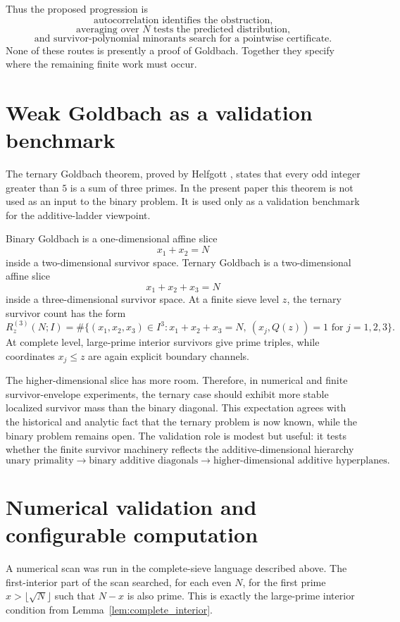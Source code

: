 \documentclass[11pt]{article}
\theoremstyle{plain}
\theoremstyle{definition}
\theoremstyle{remark}
\begin{document}
Thus the proposed progression is
\[
\text{autocorrelation identifies the obstruction,}
\]
\[
\text{averaging over }N\text{ tests the predicted distribution,}
\]
\[
\text{and survivor-polynomial minorants search for a pointwise certificate.}
\]
None of these routes is presently a proof of Goldbach.  Together they specify
where the remaining finite work must occur.

\section{Weak Goldbach as a validation benchmark}
\label{sec:weak}

The ternary Goldbach theorem, proved by Helfgott \cite{Helfgott2013,Helfgott2015},
states that every odd integer greater than \(5\) is a sum of three primes.  In
the present paper this theorem is not used as an input to the binary problem.
It is used only as a validation benchmark for the additive-ladder viewpoint.

Binary Goldbach is a one-dimensional affine slice
\[
x_1+x_2=N
\]
inside a two-dimensional survivor space.  Ternary Goldbach is a two-dimensional
affine slice
\[
x_1+x_2+x_3=N
\]
inside a three-dimensional survivor space.  At a finite sieve level \(z\), the
ternary survivor count has the form
\[
R_z^{(3)}(N;I)=
\#\{(x_1,x_2,x_3)\in I^3:x_1+x_2+x_3=N,
\ (x_j,Q(z))=1\text{ for }j=1,2,3\}.
\]
At complete level, large-prime interior survivors give prime triples, while
coordinates \(x_j\le z\) are again explicit boundary channels.

The higher-dimensional slice has more room.  Therefore, in numerical and finite
survivor-envelope experiments, the ternary case should exhibit more stable
localized survivor mass than the binary diagonal.  This expectation agrees with
the historical and analytic fact that the ternary problem is now known, while the
binary problem remains open.  The validation role is modest but useful: it tests
whether the finite survivor machinery reflects the additive-dimensional hierarchy
\[
\text{unary primality}
\longrightarrow
\text{binary additive diagonals}
\longrightarrow
\text{higher-dimensional additive hyperplanes}.
\]


\section{Numerical validation and configurable computation}
\label{sec:numerics}

A numerical scan was run in the complete-sieve language described above.  The
first-interior part of the scan searched, for each even \(N\), for the first
prime \(x>\lfloor\sqrt N\rfloor\) such that \(N-x\) is also prime.  This is
exactly the large-prime interior condition from Lemma~\ref{lem:complete_interior}.
\end{document}
